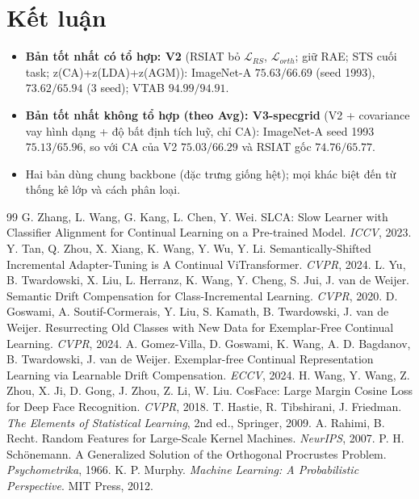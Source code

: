 \documentclass[11pt]{article}
\begin{document}
\section{Kết luận}
\begin{itemize}
\item \textbf{Bản tốt nhất có tổ hợp: V2} (RSIAT bỏ $\mathcal{L}_{RS}$, $\mathcal{L}_{orth}$; giữ RAE; STS cuối task;
      z(CA)+z(LDA)+z(AGM)): ImageNet-A $75.63/66.69$ (seed 1993), $73.62/65.94$ (3 seed); VTAB $94.99/94.91$.
\item \textbf{Bản tốt nhất không tổ hợp (theo Avg): V3-specgrid} (V2 + covariance vay hình dạng + độ bất định tích luỹ,
      chỉ CA): ImageNet-A seed 1993 $75.13/65.96$, so với CA của V2 $75.03/66.29$ và RSIAT gốc $74.76/65.77$.
\item Hai bản dùng chung backbone (đặc trưng giống hệt); mọi khác biệt đến từ thống kê lớp và cách phân loại.
\end{itemize}

\begin{thebibliography}{99}
 G. Zhang, L. Wang, G. Kang, L. Chen, Y. Wei. SLCA: Slow Learner with Classifier Alignment for Continual
Learning on a Pre-trained Model. \emph{ICCV}, 2023.
 Y. Tan, Q. Zhou, X. Xiang, K. Wang, Y. Wu, Y. Li. Semantically-Shifted Incremental Adapter-Tuning is A
Continual ViTransformer. \emph{CVPR}, 2024.
 L. Yu, B. Twardowski, X. Liu, L. Herranz, K. Wang, Y. Cheng, S. Jui, J. van de Weijer. Semantic Drift
Compensation for Class-Incremental Learning. \emph{CVPR}, 2020.
 D. Goswami, A. Soutif-Cormerais, Y. Liu, S. Kamath, B. Twardowski, J. van de Weijer. Resurrecting Old
Classes with New Data for Exemplar-Free Continual Learning. \emph{CVPR}, 2024.
 A. Gomez-Villa, D. Goswami, K. Wang, A. D. Bagdanov, B. Twardowski, J. van de Weijer. Exemplar-free
Continual Representation Learning via Learnable Drift Compensation. \emph{ECCV}, 2024.
 H. Wang, Y. Wang, Z. Zhou, X. Ji, D. Gong, J. Zhou, Z. Li, W. Liu. CosFace: Large Margin Cosine Loss
for Deep Face Recognition. \emph{CVPR}, 2018.
 T. Hastie, R. Tibshirani, J. Friedman. \emph{The Elements of Statistical Learning}, 2nd ed., Springer, 2009.
 A. Rahimi, B. Recht. Random Features for Large-Scale Kernel Machines. \emph{NeurIPS}, 2007.
 P. H. Schönemann. A Generalized Solution of the Orthogonal Procrustes Problem. \emph{Psychometrika},
1966.
 K. P. Murphy. \emph{Machine Learning: A Probabilistic Perspective}. MIT Press, 2012.
\end{thebibliography}
\end{document}
